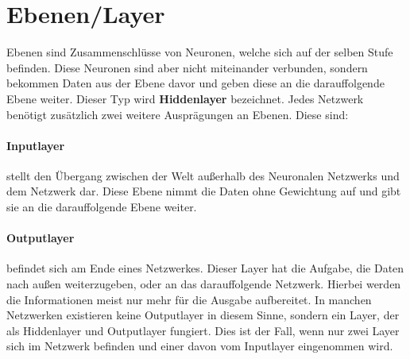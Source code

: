 \section{Ebenen/Layer}
\label{sec:Layer}

Ebenen sind Zusammenschlüsse von Neuronen, welche sich auf der selben Stufe befinden. 
Diese Neuronen sind aber nicht miteinander verbunden, sondern bekommen Daten aus der Ebene davor und geben diese an die darauffolgende Ebene weiter. 
Dieser Typ wird \textbf{Hiddenlayer} bezeichnet. 
Jedes Netzwerk benötigt zusätzlich zwei weitere Ausprägungen an Ebenen. 
Diese sind:

\paragraph{Inputlayer} stellt den Übergang zwischen der Welt außerhalb des Neuronalen Netzwerks und dem Netzwerk dar.
Diese Ebene nimmt die Daten ohne Gewichtung auf und gibt sie an die darauffolgende Ebene weiter. 

\paragraph{Outputlayer} befindet sich am Ende eines Netzwerkes. 
Dieser Layer hat die Aufgabe, die Daten nach außen weiterzugeben, oder an das darauffolgende Netzwerk. 
Hierbei werden die Informationen meist nur mehr für die Ausgabe aufbereitet. 
In manchen Netzwerken existieren keine Outputlayer in diesem Sinne, sondern ein Layer, der als Hiddenlayer und Outputlayer fungiert. 
Dies ist der Fall, wenn nur zwei Layer sich im Netzwerk befinden und einer davon vom Inputlayer eingenommen wird.
\\

